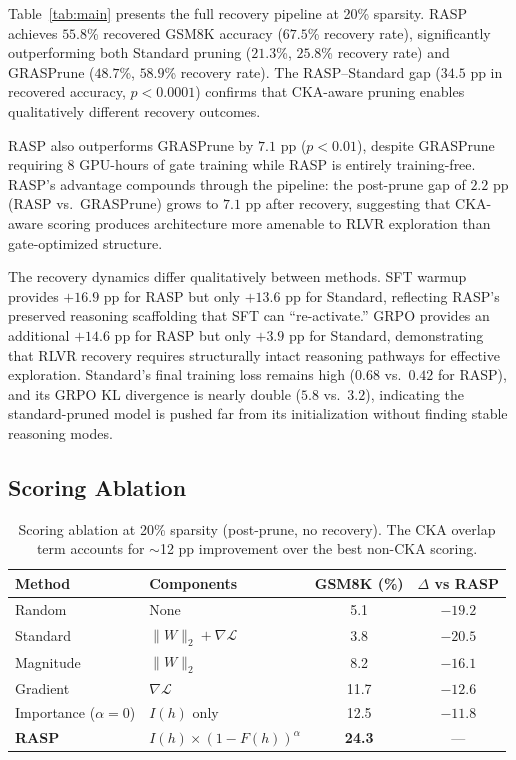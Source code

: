 \documentclass[11pt,a4paper]{article}
\begin{document}
Table~\ref{tab:main} presents the full recovery pipeline at 20\% sparsity. RASP achieves $55.8$\% recovered GSM8K accuracy ($67.5$\% recovery rate), significantly outperforming both Standard pruning ($21.3$\%, $25.8$\% recovery rate) and GRASPrune ($48.7$\%, $58.9$\% recovery rate). The RASP--Standard gap ($34.5$ pp in recovered accuracy, $p < 0.0001$) confirms that CKA-aware pruning enables qualitatively different recovery outcomes.

RASP also outperforms GRASPrune by $7.1$ pp ($p < 0.01$), despite GRASPrune requiring 8 GPU-hours of gate training while RASP is entirely training-free. RASP's advantage compounds through the pipeline: the post-prune gap of $2.2$ pp (RASP vs.\ GRASPrune) grows to $7.1$ pp after recovery, suggesting that CKA-aware scoring produces architecture more amenable to RLVR exploration than gate-optimized structure.

The recovery dynamics differ qualitatively between methods. SFT warmup provides $+16.9$ pp for RASP but only $+13.6$ pp for Standard, reflecting RASP's preserved reasoning scaffolding that SFT can ``re-activate.'' GRPO provides an additional $+14.6$ pp for RASP but only $+3.9$ pp for Standard, demonstrating that RLVR recovery requires structurally intact reasoning pathways for effective exploration. Standard's final training loss remains high ($0.68$ vs.\ $0.42$ for RASP), and its GRPO KL divergence is nearly double ($5.8$ vs.\ $3.2$), indicating the standard-pruned model is pushed far from its initialization without finding stable reasoning modes.

\subsection{Scoring Ablation}
\label{sec:ablation}

\begin{table}[t]
\centering
\small
\begin{tabular}{@{}llcc@{}}
\toprule
\textbf{Method} & \textbf{Components} & \textbf{GSM8K (\%)} & \textbf{$\Delta$ vs RASP} \\
\midrule
Random & None & 5.1 & $-19.2$ \\
Standard & $\|W\|_2 + \nabla\mathcal{L}$ & 3.8 & $-20.5$ \\
Magnitude & $\|W\|_2$ & 8.2 & $-16.1$ \\
Gradient & $\nabla\mathcal{L}$ & 11.7 & $-12.6$ \\
Importance ($\alpha\!=\!0$) & $I(h)$ only & 12.5 & $-11.8$ \\
\textbf{RASP} & $I(h) \times (1\!-\!F(h))^\alpha$ & \textbf{24.3} & --- \\
\bottomrule
\end{tabular}
\caption{Scoring ablation at 20\% sparsity (post-prune, no recovery). The CKA overlap term accounts for $\sim$12 pp improvement over the best non-CKA scoring.}
\label{tab:ablation}
\end{table}
\end{document}
